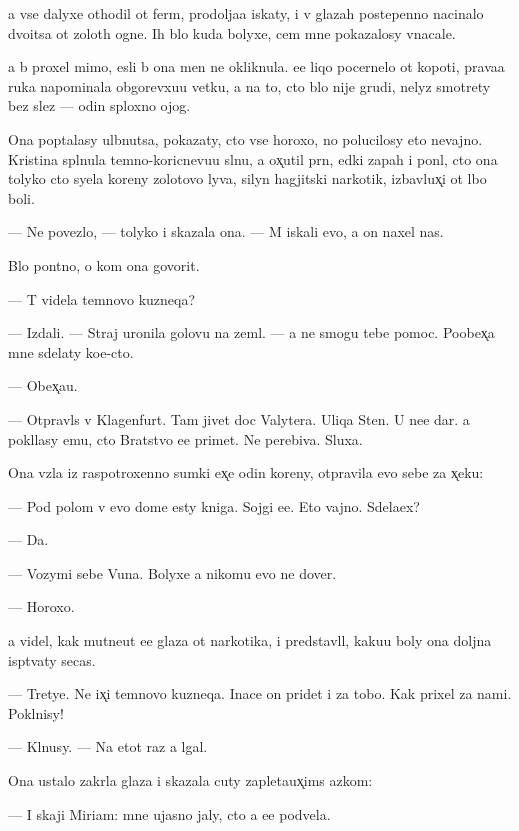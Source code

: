 \documentclass[10pt]{book}
\begin{document}
{\Y}a vse dalyxe othodil ot ferm{\yi}, prodolja{\y}a iskaty, i v glazah postepenno nacinalo dvo{\y}itsa ot zolot{\yi}h ogne{\y}. Ih b{\yi}lo kuda bolyxe, cem mne pokazalosy vnacale.

{\Y}a b{\yi} proxel mimo, {\y}esli b{\yi} ona men{\ia} ne okliknula. {\Y}ee liqo pocernelo ot kopoti, prava{\y}a ruka napominala obgorevxu{\y}u vetku, a na to, cto b{\yi}lo nije grudi, nelyz{\ia} smotrety bez slez — odin sploxno{\y} ojog.

Ona pop{\yi}talasy ul{\yi}bnutsa, pokazaty, cto vse horoxo, no polucilosy eto nevajno. Kristina spl{\iu}nula temno-koricnevu{\y}u sl{\iu}nu, {\y}a ox̨util pr{\ia}n{\yi}{\y}, {\y}edki{\y} zapah i pon{\ia}l, cto ona tolyko cto syela koreny zolotovo lyva, silyn{\yi}{\y} hagjitski{\y} narkotik, izbavl{\ia}{\y}ux̨i{\y} ot l{\iu}bo{\y} boli.

— Ne povezlo, — tolyko i skazala ona. — M{\yi} iskali {\y}evo, a on naxel nas.

B{\yi}lo pon{\ia}tno, o kom ona govorit.

— T{\yi} videla temnovo kuzneqa?

— Izdali. — Straj uronila golovu na zeml{\iu}. — {\Y}a ne smogu tebe pomoc. Poobex̨a{\y} mne sdelaty ko{\y}e-cto.

— Obex̨a{\y}u.

— Otpravl{\ia}{\y}s{\ia} v Klagenfurt. Tam jivet doc Valytera. Uliqa Sten{\yi}. U ne{\y}e dar. {\Y}a pokl{\ia}lasy {\y}emu, cto Bratstvo {\y}e{\y}e primet. Ne perebiva{\y}. Sluxa{\y}.

Ona vz{\ia}la iz raspotroxenno{\y} sumki {\y}ex̨e odin koreny, otpravila {\y}evo sebe za x̨eku:

— Pod polom v {\y}evo dome {\y}esty kniga. Sojgi {\y}e{\y}e. Eto vajno. Sdela{\y}ex?

— Da.

— Vozymi sebe V{\y}una. Bolyxe {\y}a nikomu {\y}evo ne dover{\iu}.

— Horoxo.

{\Y}a videl, kak mutne{\y}ut {\y}e{\y}e glaza ot narkotika, i predstavl{\ia}l, kaku{\y}u boly ona doljna isp{\yi}t{\yi}vaty se{\y}cas.

— Tretye. Ne ix̨i temnovo kuzneqa. Inace on pridet i za tobo{\y}. Kak prixel za nami. Pokl{\ia}nisy!

— Kl{\ia}nusy. — Na etot raz {\y}a lgal.

Ona ustalo zakr{\yi}la glaza i skazala cuty zapleta{\y}ux̨ims{\ia} {\y}az{\yi}kom:

— I skaji Miriam: mne ujasno jaly, cto {\y}a {\y}e{\y}e podvela.
\end{document}
